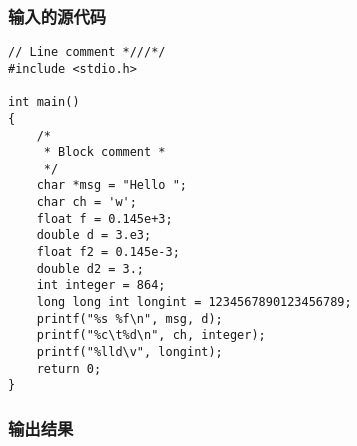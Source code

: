 \documentclass[lang=cn,11pt,a4paper]{elegantpaper}
\begin{document}
\subsubsection{输入的源代码}

\begin{lstlisting}
// Line comment *///*/
#include <stdio.h>

int main()
{
    /*
     * Block comment *
     */
    char *msg = "Hello ";
    char ch = 'w';
    float f = 0.145e+3;
    double d = 3.e3;
    float f2 = 0.145e-3;
    double d2 = 3.;
    int integer = 864;
    long long int longint = 1234567890123456789;
    printf("%s %f\n", msg, d);
    printf("%c\t%d\n", ch, integer);
    printf("%lld\v", longint);
    return 0;
}
\end{lstlisting}

\subsubsection{输出结果}
\end{document}
